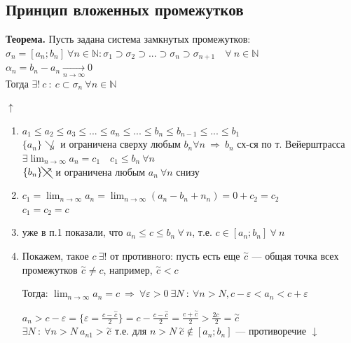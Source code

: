 \documentclass{article}
\begin{document}
    \subsection{Принцип вложенных промежутков}
    
    \textbf{Теорема.} Пусть задана система замкнутых промежутков:\\
    \(\sigma_n = [a_n; b_n]\ \forall n \in \mathbb{N}:\sigma_1 \supset \sigma_2 \supset ... \supset \sigma_n \supset \sigma_{n+1}\quad \forall\ n \in \mathbb{N}\)\\
    \(\alpha_n = b_n - a_n \xrightarrow[n \rightarrow \infty]{} 0\)\\
    Тогда \(\exists !\ c\ :\ c \subset \sigma_n\ \forall n \in \mathbb{N}\)

    \(\uparrow\)
    \begin{enumerate}
        \item \(a_1 \leq a_2 \leq a_3 \leq ... \leq a_n \leq ... \leq b_n \leq b_{n-1} \leq ... \leq b_1\)\\
    \(\{ a_n \} \not\searrow\) и ограничена сверху любым \(b_n \forall n\ \Rightarrow\ b_n\) сх-ся по т. Вейерштрасса
    \\\(\exists \lim_{n \rightarrow \infty}{a_n} = c_1 \quad c_1 \leq b_n \ \forall n\)
    \\\(\{b_n\} \bcancel{\nearrow}\) и ограничена любым \(a_n\ \forall n\) снизу
        \item \( c_1 = \lim_{n \rightarrow \infty} a_n = \lim_{n \rightarrow \infty} (a_n - b_n + n_n) = 0 + c_2 = c_2 \)\\
    \( c_1 = c_2 = c \)\\
        \item уже в п.1 показали, что \(a_n \leq c \leq b_n\ \forall\ n\), т.е. \( c \in [a_n; b_n]\ \forall\ n \)
        
        \item Покажем, такое \( c\ \exists! \) от противного: пусть есть еще \( \overset{\sim}{c} \) --- общая точка всех промежутков \( \overset{\sim}{c} \neq c \), например, \( \overset{\sim}{c} < c \)

    Тогда: \(\lim_{n \rightarrow \infty}{a_n} = c\ \Rightarrow\ \forall \varepsilon > 0 \ \exists N\ :\ \forall n > N, c - \varepsilon < a_n < c + \varepsilon\)

    \(a_n > c - \varepsilon = \{\varepsilon = \frac{c-\overset{\sim}{c}}{2}\} = c - \frac{c - \overset{\sim}{c}}{2} = \frac{c + \overset{\sim}{c}}{2} > \frac{2c^{~}}{2} = \overset{\sim}{c}\)
    \\\(\exists N\ :\ \forall n > N\ a_{n1} > \overset{\sim}{c}\) т.е. для \(n > N\ \overset{\sim}{c} \not\in [a_n; b_n]\) --- противоречие \(\downarrow\)
    \end{enumerate}
\end{document}
